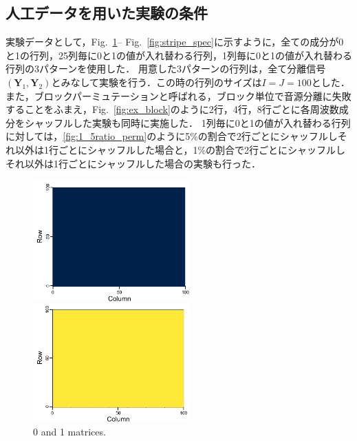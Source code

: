 \subsection{人工データを用いた実験の条件}
\label{sec:ex_condition_matrix}
実験データとして，Fig.~\ref{fig:01mat_spec}-- Fig.~\ref{fig:stripe_spec}に示すように，全ての成分が0と1の行列，25列毎に0と1の値が入れ替わる行列，1列毎に0と1の値が入れ替わる行列の3パターンを使用した．
用意した3パターンの行列は，全て分離信号$(\bm{Y}_1, \bm{Y}_2)$とみなして実験を行う．この時の行列のサイズは$I=J=100$とした．
また，ブロックパーミュテーションと呼ばれる，ブロック単位で音源分離に失敗することをふまえ，Fig.~\ref{fig:ex_block}のように2行，4行，8行ごとに各周波数成分をシャッフルした実験も同時に実施した．
1列毎に0と1の値が入れ替わる行列に対しては，\ref{fig:1_5ratio_perm}のように5\%の割合で2行ごとにシャッフルしそれ以外は1行ごとにシャッフルした場合と，1\%の割合で2行ごとにシャッフルしそれ以外は1行ごとにシャッフルした場合の実験も行った．

\begin{figure}[htbp]
    \begin{minipage}[b]{0.45\linewidth}
      \centering
      \includegraphics[keepaspectratio, width=6.0cm]{figures/origi_spec/0mat.pdf}
    \end{minipage}
    \begin{minipage}[b]{0.45\linewidth}
      \centering
      \includegraphics[keepaspectratio, width=6.0cm]{figures/origi_spec/1mat.pdf}
    \end{minipage}
    \caption{0 and 1 matrices.}
    \label{fig:01mat_spec}
\end{figure}

